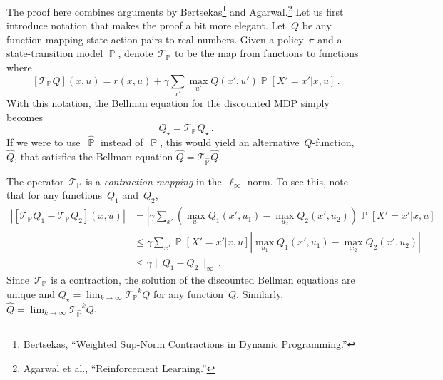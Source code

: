 \documentclass{tufte-book}
\begin{document}
The proof here combines arguments by Bertsekas\footnote{Bertsekas,
  {``Weighted Sup-Norm Contractions in Dynamic Programming.''}} and
Agarwal.\footnote{Agarwal et al., {``Reinforcement Learning.''}} Let us
first introduce notation that makes the proof a bit more elegant.
Let~\(Q\) be any function mapping state-action pairs to real numbers.
Given a policy~\(\pi\) and a state-transition model
\(\mathop\mathbb{P}\), denote~\({\mathcal{T}_{\mathop\mathbb{P}}}^{}\)
to be the map from functions to functions where \[
    [{\mathcal{T}_{\mathop\mathbb{P}}}^{}Q ](x,u) = r(x,u)+\gamma \sum_{x'} \max_{u'} Q(x',u') \mathop\mathbb{P}[X'=x'|x,u]  \,.
\] With this notation, the Bellman equation for the discounted MDP
simply becomes \[
    Q_\star = {\mathcal{T}_{\mathop\mathbb{P}}}^{}Q_\star\,.
\] If we were to use~\(\hat{\mathop\mathbb{P}}\) instead
of~\(\mathop\mathbb{P}\), this would yield an
alternative~\(Q\)-function,~\(\hat{Q}\), that satisfies the Bellman
equation \(\hat{Q} ={\mathcal{T}_{\hat{\mathop\mathbb{P}}}}^{}\hat{Q}\).

The operator~\({\mathcal{T}_{\mathop\mathbb{P}}}^{}\) is a
\emph{contraction mapping} in the~\(\ell_\infty\) norm. To see this,
note that for any functions~\(Q_1\) and~\(Q_2\), \[
\begin{aligned}
    |[{\mathcal{T}_{\mathop\mathbb{P}}}^{}Q_1 - {\mathcal{T}_{\mathop\mathbb{P}}}^{}Q_2 ](x,u)  | &= \left| \gamma \sum_{x'} (\max_{u_1} Q_1(x',u_1) - \max_{u_2} Q_2(x',u_2)) \mathop\mathbb{P}[X'=x'|x,u]  \right|\\
    & \leq \gamma \sum_{x'} \mathop\mathbb{P}[X'=x'|x,u]  \left|  \max_{u_1} Q_1(x',u_1) - \max_{x_2} Q_2(x',u_2) \right| \\
    & \leq \gamma\|Q_1-Q_2\|_\infty\,.
    \end{aligned}
\] Since~\({\mathcal{T}_{\mathop\mathbb{P}}}^{}\) is a contraction, the
solution of the discounted Bellman equations are unique and
\(Q_\star =\lim_{k\rightarrow \infty} {\mathcal{T}_{\mathop\mathbb{P}}}^{k}Q\)
for any function~\(Q\). Similarly,
\(\hat{Q} =\lim_{k\rightarrow \infty} {\mathcal{T}_{\hat{\mathop\mathbb{P}}}}^{k}Q\).
\end{document}
